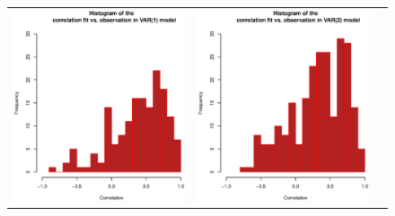 \begin{figure}[h!]
\centering
\begin{tabular}{ccc}
\includegraphics[scale=0.275]{Figure_7a.eps} & 
\includegraphics[scale=0.275]{Figure_7b.eps} &

\end{tabular}
\end{figure}
